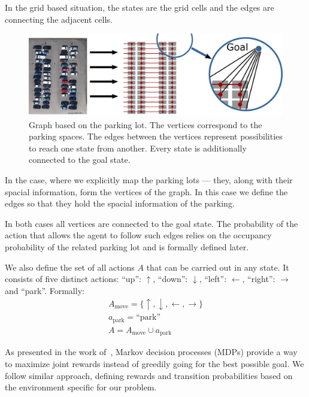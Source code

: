 In the grid based situation, the states are the grid cells and the edges are
connecting the adjacent cells.

\begin{figure}[t]
    \begin{center}
        \includegraphics[width=\textwidth]{pictures/graph.pdf}
    \end{center}
    \caption{Graph based on the parking lot. The vertices correspond to the parking spaces. The edges between the vertices represent possibilities to reach one state from another. Every state is additionally connected to the goal state.}
    \vspace{-5mm}
    \label{fig:graph}
\end{figure}

In the case, where we explicitly map the parking lots --- they, along with
their spacial information, form the vertices of the graph. In this case we
define the edges so that they hold the spacial information of the parking.

In both cases all vertices are connected to the goal state. The probability of
the action that allows the agent to follow such edges relies on the occupancy
probability of the related parking lot and is formally defined later.

We also define the set of all actions $A$ that can be carried out in any
state. It consists of five distinct actions: ``up'': $\uparrow$, ``down'':
$\downarrow$, ``left'': $\leftarrow$, ``right'': $\rightarrow$ and ``park''.
Formally:
\begin{eqnarray}
A_{\mathrm{move}} = \{ \uparrow, \downarrow, \leftarrow, \rightarrow \} \\
a_{\mathrm{park}} = \mbox{``park''} \\
A = A_{\mathrm{move}} \cup a_{\mathrm{park}}
\label{eq:actions}
\end{eqnarray}

As presented in the work of~\citet{tipaldiICRA11}, Markov decision processes
(MDPs) provide a way to maximize joint rewards instead of greedily going for
the best possible goal. We follow similar approach, defining rewards and
transition probabilities based on the environment specific for our problem.

